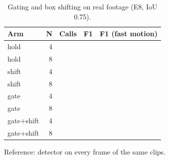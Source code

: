 \begin{table}[t]
\centering\small
\caption{Gating and box shifting on real footage (E8, IoU 0.75).}\label{tab:gating-real}
\begin{tabular}{lrrrr}
\toprule
Arm & N & Calls & F1 & F1 (fast motion) \\
\midrule
hold & 4 & \TBD{} & \TBD{} & \TBD{} \\
hold & 8 & \TBD{} & \TBD{} & \TBD{} \\
shift & 4 & \TBD{} & \TBD{} & \TBD{} \\
shift & 8 & \TBD{} & \TBD{} & \TBD{} \\
gate & 4 & \TBD{} & \TBD{} & \TBD{} \\
gate & 8 & \TBD{} & \TBD{} & \TBD{} \\
gate+shift & 4 & \TBD{} & \TBD{} & \TBD{} \\
gate+shift & 8 & \TBD{} & \TBD{} & \TBD{} \\
\bottomrule
\end{tabular}
\par\smallskip\footnotesize Reference: detector on every frame of the same clips.
\end{table}
